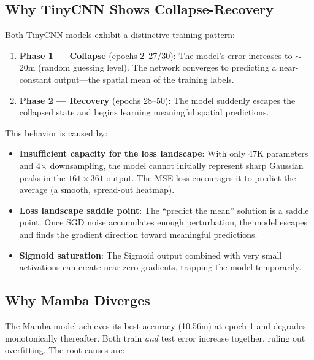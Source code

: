 \documentclass[11pt,a4paper]{article}
\begin{document}
\subsection{Why TinyCNN Shows Collapse-Recovery}

Both TinyCNN models exhibit a distinctive training pattern:
\begin{enumerate}[leftmargin=*]
    \item \textbf{Phase 1 --- Collapse} (epochs 2--27/30): The model's error increases to $\sim$20m (random guessing level). The network converges to predicting a near-constant output---the spatial mean of the training labels.
    \item \textbf{Phase 2 --- Recovery} (epochs 28--50): The model suddenly escapes the collapsed state and begins learning meaningful spatial predictions.
\end{enumerate}

This behavior is caused by:
\begin{itemize}[leftmargin=*]
    \item \textbf{Insufficient capacity for the loss landscape}: With only 47K parameters and 4$\times$ downsampling, the model cannot initially represent sharp Gaussian peaks in the $161\times361$ output. The MSE loss encourages it to predict the average (a smooth, spread-out heatmap).
    \item \textbf{Loss landscape saddle point}: The ``predict the mean'' solution is a saddle point. Once SGD noise accumulates enough perturbation, the model escapes and finds the gradient direction toward meaningful predictions.
    \item \textbf{Sigmoid saturation}: The Sigmoid output combined with very small activations can create near-zero gradients, trapping the model temporarily.
\end{itemize}

\subsection{Why Mamba Diverges}

The Mamba model achieves its best accuracy (10.56m) at epoch 1 and degrades monotonically thereafter. Both train \textit{and} test error increase together, ruling out overfitting. The root causes are:
\end{document}
